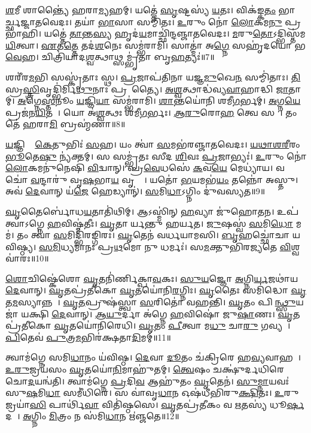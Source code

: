 \ul{𑌶}𑌮𑍀 𑌶𑌾𑌨𑍍𑌤𑍍𑌯𑍈॑ 𑌹𑌰𑌾\ul{𑌮𑍍𑌯}𑌹𑌮𑍍।
𑌯𑌤𑍍𑌤𑍇॑ \ul{𑌸𑍃}𑌷𑍍𑌟𑌸𑍍𑌯॑ \ul{𑌯}𑌤𑌃।
𑌵𑌿𑌕॑𑌙𑍍𑌕\ul{𑌤𑌂} 𑌭𑌾 𑌆᳚𑌰𑍍𑌚𑍍𑌛𑌜𑍍𑌜𑌾𑌤𑌵𑍇𑌦𑌃।
𑌤𑌯𑌾॑ \ul{𑌭𑌾}𑌸𑌾 𑌸𑌮𑍍𑌮𑌿॑𑌤𑌃।
\ul{𑌉}𑌰𑍁𑌂 𑌨𑍋॑ \ul{𑌲𑍋}𑌕𑌮\ul{𑌨𑍁} 𑌪𑍍𑌰𑌭𑌾॑𑌹𑌿।
𑌯𑌤𑍍𑌤𑍇॑ \ul{𑌤𑌾}𑌨𑍍𑌤\ul{𑌸𑍍𑌯} 𑌹𑍃𑌦॑\ul{𑌯}𑌮𑌾𑌚𑍍𑌛𑌿॑𑌨𑍍𑌦𑌞𑍍𑌜𑌾𑌤𑌵𑍇𑌦𑌃।
\ul{𑌮}𑌰𑍁\ul{𑌤𑍋}\-𑌽𑌦𑍍𑌭𑌿𑌸𑍍𑌤॑𑌮\ul{𑌯𑌿}𑌤𑍍𑌵𑌾।
\ul{𑌏}𑌤\ul{𑌤𑍍𑌤𑍇} 𑌤𑌦॑\ul{𑌶}𑌨𑍇𑌃 𑌸𑌮𑍍𑌭॑𑌰𑌾𑌮𑌿।
𑌸𑌾𑌤𑍍𑌮𑌾॑ 𑌅\ul{𑌗𑍍𑌨𑍇} 𑌸𑌹𑍃॑𑌦𑌯𑍋 𑌭\ul{𑌵𑍇}𑌹।
𑌚𑌿𑌤𑍍𑌰𑌿॑𑌯𑌾𑌦\ul{𑌶𑍍𑌵}𑌤𑍍𑌥𑌾𑌥𑍍𑌸𑌮𑍍𑌭𑍃॑𑌤𑌾 𑌬𑍃\ul{𑌹}𑌤𑍍𑌯𑌃॑॥7॥

𑌶𑌰𑍀॑𑌰\ul{𑌮}𑌭𑌿 𑌸𑌸𑍍𑌕𑍃॑𑌤𑌾𑌃 𑌸𑍍𑌥।
\ul{𑌪𑍍𑌰}𑌜𑌾𑌪॑𑌤𑌿𑌨𑌾 𑌯𑌜𑍍𑌞\ul{𑌮𑍁}𑌖𑍇\ul{𑌨} 𑌸𑌮𑍍𑌮𑌿॑𑌤𑌾𑌃।
\ul{𑌤𑌿}𑌸𑍍𑌰\ul{𑌸𑍍𑌤𑍍𑌰𑌿}𑌵𑍃𑌦𑍍𑌭𑌿॑𑌰𑍍𑌮𑌿\ul{𑌥𑍁}𑌨𑌾𑌃 𑌪𑍍𑌰𑌜𑌾᳚𑌤𑍍𑌯𑍈।
\ul{𑌅}\ul{𑌶𑍍𑌵}𑌤𑍍𑌥𑌾𑌦𑍍𑌧॑𑌵𑍍𑌯\-\ul{𑌵𑌾}𑌹𑌾𑌦𑍍𑌧𑌿 \ul{𑌜𑌾}𑌤𑌾𑌮𑍍।
\ul{𑌅}𑌗𑍍𑌨𑍇\ul{𑌸𑍍𑌤}𑌨𑍂𑌂 \ul{𑌯}𑌜𑍍𑌞𑌿\ul{𑌯𑌾}\ul{} 𑌸𑌮𑍍𑌭॑𑌰𑌾𑌮𑌿।
\ul{𑌶𑌾}𑌨𑍍𑌤𑌯𑍋॑𑌨𑌿 𑌶𑌮𑍀\ul{𑌗}𑌰𑍍𑌭𑌮𑍍।
\ul{𑌅}𑌗𑍍𑌨\ul{𑌯𑍇} 𑌪𑍍𑌰𑌜॑𑌨\ul{𑌯𑌿}𑌤𑌵𑍇᳚।
𑌯𑍋 𑌅॑\ul{𑌶𑍍𑌵}𑌤𑍍𑌥𑌃 𑌶॑𑌮𑍀\ul{𑌗}𑌰𑍍𑌭𑌃।
\ul{𑌆}\ul{𑌰𑍁}𑌰𑍋\ul{𑌹} 𑌤𑍍𑌵𑍇 𑌸𑌚𑌾᳚।
𑌤𑌂 𑌤𑍇॑ 𑌹𑌰𑌾\ul{𑌮𑌿} 𑌬𑍍𑌰𑌹𑍍𑌮॑𑌣𑌾॥8॥

\ul{𑌯}𑌜𑍍𑌞𑌿𑌯𑍈𑌃᳚ \ul{𑌕𑍇}𑌤𑍁𑌭𑌿𑌃॑ \ul{𑌸}𑌹।
𑌯𑌂 𑌤𑍍𑌵𑌾॑ \ul{𑌸}𑌮𑌭॑𑌰𑌞𑍍𑌜𑌾𑌤𑌵𑍇𑌦𑌃।
\ul{𑌯}\ul{𑌥𑌾}\ul{𑌶}\ul{𑌰𑍀}𑌰𑌂 \ul{𑌭𑍂}𑌤𑍇\ul{𑌷𑍁} 𑌨𑍍𑌯॑𑌕𑍍𑌤𑌮𑍍।
𑌸 𑌸𑌮𑍍𑌭𑍃॑𑌤𑌃 𑌸𑍀𑌦 \ul{𑌶𑌿}𑌵𑌃 \ul{𑌪𑍍𑌰}𑌜𑌾𑌭𑍍𑌯𑌃॑।
\ul{𑌉}𑌰𑍁𑌂 𑌨𑍋॑ \ul{𑌲𑍋}𑌕𑌮𑌨𑍁॑𑌨𑍇𑌷𑌿 \ul{𑌵𑌿}𑌦𑍍𑌵𑌾𑌨𑍍।
𑌪𑍍𑌰\ul{𑌵𑍇}𑌧𑌸𑍇॑ \ul{𑌕}𑌵\ul{𑌯𑍇} 𑌮𑍇𑌧𑍍𑌯𑌾॑𑌯।
𑌵𑌚𑍋॑ \ul{𑌵}𑌨𑍍𑌦𑌾𑌰𑍁॑ 𑌵𑍃\ul{𑌷}𑌭𑌾\ul{𑌯} 𑌵𑍃𑌷𑍍𑌣𑍇᳚।
𑌯𑌤𑍋॑ \ul{𑌭}𑌯𑌮𑌭॑\ul{𑌯𑌂} 𑌤𑌨𑍍𑌨𑍋॑ 𑌅𑌸𑍍𑌤𑍁।
𑌅𑌵॑ \ul{𑌦𑍇}𑌵𑌾𑌨𑍍 𑌯॑\ul{𑌜𑍇} 𑌹𑍇𑌡𑍍𑌯𑌾𑌨𑍍॑।
\ul{𑌸}𑌮𑌿\ul{𑌧𑌾}\-𑌽𑌗𑍍𑌨𑌿𑌂 𑌦𑍁॑𑌵𑌸𑍍𑌯𑌤॥9॥

\ul{𑌘𑍃}𑌤𑍈𑌰𑍍𑌬𑍋॑𑌧\ul{𑌯}𑌤𑌾𑌤𑌿॑𑌥𑌿𑌮𑍍।
𑌆𑌽𑌸𑍍𑌮𑌿॑𑌨𑍍 \ul{𑌹}𑌵𑍍𑌯𑌾 𑌜𑍁॑𑌹𑍋𑌤𑌨।
𑌉𑌪॑ 𑌤𑍍𑌵𑌾\-𑌽𑌗𑍍𑌨𑍇 \ul{𑌹}𑌵𑌿𑌷𑍍𑌮॑𑌤𑍀𑌃।
\ul{𑌘𑍃}𑌤𑌾𑌚𑍀᳚𑌰𑍍𑌯𑌨𑍍𑌤𑍁 𑌹𑌰𑍍𑌯𑌤।
\ul{𑌜𑍁}𑌷𑌸𑍍𑌵॑ \ul{𑌸}𑌮𑌿\ul{𑌧𑍋} 𑌮𑌮॑।
𑌤𑌂 𑌤𑍍𑌵𑌾॑ \ul{𑌸}𑌮𑌿𑌦𑍍𑌭𑌿॑𑌰𑌙𑍍𑌗𑌿𑌰𑌃।
\ul{𑌘𑍃}𑌤𑍇𑌨॑ 𑌵𑌰𑍍𑌧𑌯𑌾𑌮𑌸𑌿।
\ul{𑌬𑍃}𑌹𑌚𑍍𑌛𑍋॑𑌚𑌾 𑌯𑌵𑌿𑌷𑍍𑌠𑍍𑌯।
\ul{𑌸}\ul{𑌮𑌿}𑌧𑍍𑌯𑌮𑌾॑𑌨𑌃 𑌪𑍍𑌰\ul{𑌥}𑌮𑍋 𑌨𑍁 𑌧𑌰𑍍𑌮𑌃॑।
𑌸\ul{𑌮}𑌕𑍍𑌤𑍁𑌭𑌿॑𑌰𑌜𑍍𑌯𑌤𑍇 \ul{𑌵𑌿}𑌶𑍍𑌵𑌵𑌾॑𑌰𑌃॥10॥

\ul{𑌶𑍋}𑌚𑌿𑌷𑍍𑌕𑍇॑𑌶𑍋 \ul{𑌘𑍃}𑌤𑌨𑌿॑𑌰𑍍𑌣𑌿𑌕𑍍𑌪𑌾\ul{𑌵}𑌕𑌃।
\ul{𑌸𑍁}\ul{𑌯}𑌜𑍍𑌞𑍋 \ul{𑌅}𑌗𑍍𑌨𑌿\ul{𑌰𑍍𑌯}𑌜𑌥𑌾॑𑌯 \ul{𑌦𑍇}𑌵𑌾𑌨𑍍।
\ul{𑌘𑍃}𑌤𑌪𑍍𑌰॑𑌤𑍀𑌕𑍋 \ul{𑌘𑍃}𑌤𑌯𑍋॑𑌨𑌿\ul{𑌰}𑌗𑍍𑌨𑌿𑌃।
\ul{𑌘𑍃}𑌤𑍈𑌃 𑌸𑌮𑌿॑𑌦𑍍𑌧𑍋 \ul{𑌘𑍃}𑌤\ul{𑌮}𑌸𑍍𑌯𑌾𑌨𑍍𑌨𑌮𑍍᳚।
\ul{𑌘𑍃}\ul{𑌤}𑌪𑍍𑌰𑍁𑌷॑𑌸𑍍𑌤𑍍𑌵𑌾 \ul{𑌸}𑌰𑌿𑌤𑍋॑ 𑌵𑌹𑌨𑍍𑌤𑌿।
\ul{𑌘𑍃}𑌤𑌂 𑌪𑌿𑌬᳚\ul{𑌨𑍍𑌥𑍍𑌸𑍁}𑌯𑌜𑌾॑ 𑌯𑌕𑍍𑌷𑌿 \ul{𑌦𑍇}𑌵𑌾𑌨𑍍।
\ul{𑌆}\ul{𑌯𑍁}𑌰𑍍𑌦𑌾 𑌅॑𑌗𑍍𑌨𑍇 \ul{𑌹}𑌵𑌿𑌷𑍋॑ 𑌜𑍁\ul{𑌷𑌾}𑌣𑌃।
\ul{𑌘𑍃}𑌤𑌪𑍍𑌰॑𑌤𑍀𑌕𑍋 \ul{𑌘𑍃}𑌤𑌯𑍋॑𑌨𑌿𑌰𑍇𑌧𑌿।
\ul{𑌘𑍃}𑌤𑌂 \ul{𑌪𑍀}𑌤𑍍𑌵𑌾 𑌮\ul{𑌧𑍁} 𑌚𑌾\ul{𑌰𑍁} 𑌗𑌵𑍍𑌯𑌮𑍍᳚।
\ul{𑌪𑌿}𑌤𑍇𑌵॑ \ul{𑌪𑍁}𑌤𑍍𑌰\ul{𑌮}𑌭𑌿𑌰॑𑌕𑍍𑌷𑌤𑌾\ul{𑌦𑌿}𑌮𑌮𑍍॥11॥

𑌤𑍍𑌵𑌾𑌮॑𑌗𑍍𑌨𑍇 𑌸𑌮𑌿\ul{𑌧𑌾}𑌨𑌂 𑌯॑𑌵𑌿𑌷𑍍𑌠।
\ul{𑌦𑍇}𑌵𑌾 \ul{𑌦𑍂}𑌤𑌂 𑌚॑𑌕𑍍𑌰𑌿𑌰𑍇 𑌹\ul{𑌵𑍍𑌯}𑌵𑌾𑌹𑌮𑍍᳚।
\ul{𑌉}\ul{𑌰𑍁}𑌜𑍍𑌰𑌯॑𑌸𑌂 \ul{𑌘𑍃}𑌤𑌯𑍋॑\ul{𑌨𑌿}𑌮𑌾𑌹𑍁॑𑌤𑌮𑍍।
\ul{𑌤𑍍𑌵𑍇}𑌷𑌂 𑌚𑌕𑍍𑌷𑍁॑𑌰𑍍𑌦𑌧𑌿𑌰𑍇 𑌚𑍋\ul{𑌦}𑌯𑌨𑍍𑌵॑𑌤𑌿।
𑌤𑍍𑌵𑌾𑌮॑𑌗𑍍𑌨𑍇 \ul{𑌪𑍍𑌰}𑌦𑌿\ul{𑌵} 𑌆𑌹𑍁॑𑌤𑌂 \ul{𑌘𑍃}𑌤𑍇𑌨॑।
\ul{𑌸𑍁}\ul{𑌮𑍍𑌨𑌾}𑌯𑌵𑌃॑ 𑌸𑍁\ul{𑌷}𑌮𑌿\ul{𑌧𑌾} 𑌸𑌮𑍀॑𑌧𑌿𑌰𑍇।
𑌸 𑌵𑌾॑𑌵𑍃\ul{𑌧𑌾}𑌨 𑌓𑌷॑𑌧𑍀𑌭𑌿𑌰𑍁\ul{𑌕𑍍𑌷𑌿}𑌤𑌃।
\ul{𑌉}𑌰𑍁 𑌜𑍍𑌰𑌯𑌾॑\ul{𑌸𑌿} 𑌪𑌾𑌰𑍍𑌥𑌿॑\ul{𑌵𑌾} 𑌵𑌿𑌤𑌿॑𑌷𑍍𑌠𑌸𑍇।
\ul{𑌘𑍃}𑌤𑌪𑍍𑌰॑𑌤𑍀𑌕𑌂 𑌵 \ul{𑌋}𑌤𑌸𑍍𑌯॑ 𑌧𑍂\ul{𑌰𑍍}𑌷𑌦𑌮𑍍᳚।
\ul{𑌅}𑌗𑍍𑌨𑌿𑌂 \ul{𑌮𑌿}𑌤𑍍𑌰𑌂 𑌨 𑌸॑𑌮𑌿\ul{𑌧𑌾}𑌨 𑌋॑𑌞𑍍𑌜𑌤𑍇॥12॥

